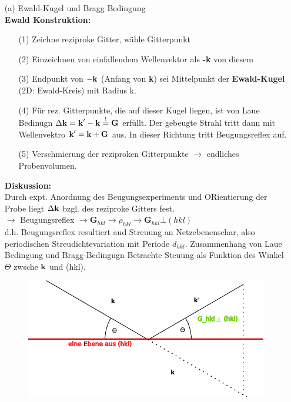 \begin{itemize}
    \item[(a)] Ewald-Kugel und Bragg Bedingung\\
    \textbf{Ewald Konstruktion:}
    \begin{itemize}
        \item[(1)] Zeichne reziproke Gitter, wähle Gitterpunkt
        \item[(2)] Einzeichnen von einfallendem Wellenvektor als \textbf{-k} von diesem
        \item[(3)] Endpunkt von $-\textbf{k}$ (Anfang von \textbf{k}) sei Mittelpunkt der \textbf{Ewald-Kugel} (2D: Ewald-Kreis) mit Radius k.
        \item[(4)] Für rez. Gitterpunkte, die auf dieser Kugel liegen, ist von Laue Bedinugn $\Delta\textbf{k} = \textbf{k}' - \textbf{k} \overset{!}{=} \textbf{G}$ erfüllt. Der gebeugte Strahl tritt dann mit Wellenvektro $\textbf{k}' = \textbf{k} + \textbf{G}$ aus. In dieser Richtung tritt Beugungsreflex auf.
        \item[(5)] Verschmierung der reziproken Gitterpunkte $\rightarrow$ endliches Probenvolumen.
    \end{itemize}
    \textbf{Diskussion:}\\
    Durch expt. Anordnung des Beugungsexperiments und ORientierung der Probe liegt $\Delta\textbf{k}$ bzgl. des reziproke Gitters fest.\\
    $\rightarrow$ Beugungsreflex $\rightarrow \textbf{G}_{hkl} \rightarrow \rho_{hkl} \rightarrow \textbf{G}_{hkl} \bot (hkl)$\\
    d.h. Beugungsreflex resultiert aud Streuung an Netzebenenschar, also periodischen Streudichtevariation mit Periode $d_{hkl}$. Zusammenhang von Laue Bedingung und Bragg-Bedingugn Betrachte Steuung als Funktion des Winkel $\Theta$ zwsche $\textbf{k}$ und (hkl).
    \begin{figure}[H]
        \centering
        \includegraphics{figures/3_3Reflection.pdf}

\end{figure}
\end{itemize}
